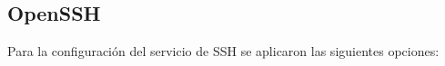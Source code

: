 %
%

      \subsection {OpenSSH}

Para la configuraci\'{o}n del servicio de \textsc{SSH} se aplicaron las siguientes opciones:

